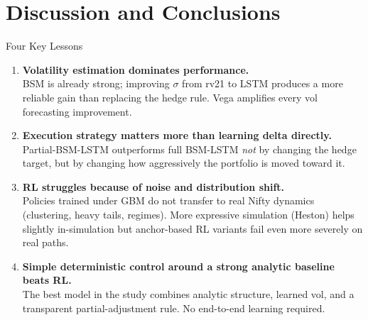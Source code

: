 \documentclass[aspectratio=169,10pt]{beamer}
\begin{document}
\section{Discussion and Conclusions}

\begin{frame}{Four Key Lessons}
\begin{enumerate}
\setlength\itemsep{0.9em}

  \item \textbf{Volatility estimation dominates performance.}\\
  BSM is already strong; improving $\sigma$ from rv21 to LSTM produces a more reliable gain than replacing the hedge rule. Vega amplifies every vol forecasting improvement.

  \item \textbf{Execution strategy matters more than learning delta directly.}\\
  Partial-BSM-LSTM outperforms full BSM-LSTM \emph{not} by changing the hedge target, but by changing how aggressively the portfolio is moved toward it.

  \item \textbf{RL struggles because of noise and distribution shift.}\\
  Policies trained under GBM do not transfer to real Nifty dynamics (clustering, heavy tails, regimes). More expressive simulation (Heston) helps slightly in-simulation but anchor-based RL variants fail even more severely on real paths.

  \item \textbf{Simple deterministic control around a strong analytic baseline beats RL.}\\
  The best model in the study combines analytic structure, learned vol, and a transparent partial-adjustment rule. No end-to-end learning required.

\end{enumerate}
\end{frame}
\end{document}
